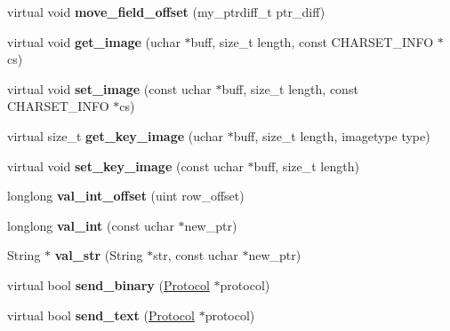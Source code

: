 \begin{DoxyCompactItemize}
\item 
\mbox{\label{classField_ac714ec81a29a238b19d06791c4260820}} 
virtual void {\bfseries move\+\_\+field\+\_\+offset} (my\+\_\+ptrdiff\+\_\+t ptr\+\_\+diff)
\item 
\mbox{\label{classField_a2b77d7097951b2a32e001c4b28dea43e}} 
virtual void {\bfseries get\+\_\+image} (uchar $\ast$buff, size\+\_\+t length, const C\+H\+A\+R\+S\+E\+T\+\_\+\+I\+N\+FO $\ast$cs)
\item 
\mbox{\label{classField_a8e7baae99610b8f1d772f129912d080b}} 
virtual void {\bfseries set\+\_\+image} (const uchar $\ast$buff, size\+\_\+t length, const C\+H\+A\+R\+S\+E\+T\+\_\+\+I\+N\+FO $\ast$cs)
\item 
\mbox{\label{classField_ab0e702cfe0d20c41027ba6abd614deae}} 
virtual size\+\_\+t {\bfseries get\+\_\+key\+\_\+image} (uchar $\ast$buff, size\+\_\+t length, imagetype type)
\item 
\mbox{\label{classField_afc275dec1a4ea54fd0695630e530371e}} 
virtual void {\bfseries set\+\_\+key\+\_\+image} (const uchar $\ast$buff, size\+\_\+t length)
\item 
\mbox{\label{classField_a5975e9e528944aad17c72c8e54317dad}} 
longlong {\bfseries val\+\_\+int\+\_\+offset} (uint row\+\_\+offset)
\item 
\mbox{\label{classField_a3821d05ba3b6115657ff93f83a0d1f85}} 
longlong {\bfseries val\+\_\+int} (const uchar $\ast$new\+\_\+ptr)
\item 
\mbox{\label{classField_a085e158f8f30450c0d14983a9398ffd6}} 
String $\ast$ {\bfseries val\+\_\+str} (String $\ast$str, const uchar $\ast$new\+\_\+ptr)
\item 
\mbox{\label{classField_ae1f63a967084d01ee2f8109a69117d28}} 
virtual bool {\bfseries send\+\_\+binary} (\mbox{\hyperlink{classProtocol}{Protocol}} $\ast$protocol)
\item 
\mbox{\label{classField_a647e41dabe3e101959df641afea5e409}} 
virtual bool {\bfseries send\+\_\+text} (\mbox{\hyperlink{classProtocol}{Protocol}} $\ast$protocol)

\end{DoxyCompactItemize}
